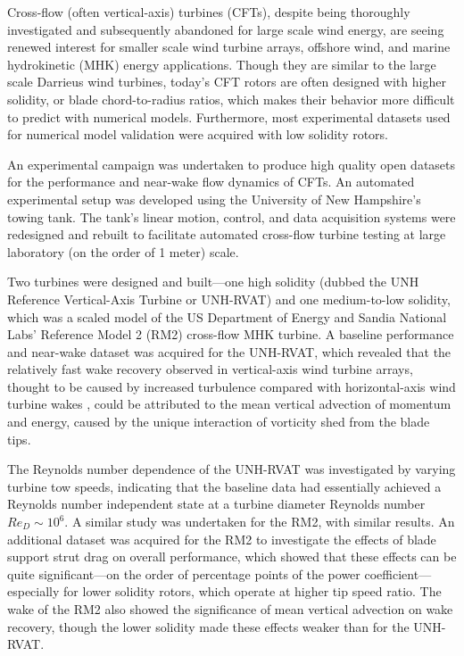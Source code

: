 \begin{Abstractpage}

\setlength{\baselineskip}{1.5\baselineskip}
{

Cross-flow (often vertical-axis) turbines (CFTs), despite being thoroughly
investigated and subsequently abandoned for large scale wind energy, are seeing
renewed interest for smaller scale wind turbine arrays, offshore wind, and
marine hydrokinetic (MHK) energy applications. Though they are similar to the
large scale Darrieus wind turbines, today's CFT rotors are often designed with
higher solidity, or blade chord-to-radius ratios, which makes their behavior
more difficult to predict with numerical models. Furthermore, most experimental
datasets used for numerical model validation were acquired with low solidity
rotors.

An experimental campaign was undertaken to produce high quality open datasets
for the performance and near-wake flow dynamics of CFTs. An automated
experimental setup was developed using the University of New Hampshire's towing
tank. The tank's linear motion, control, and data acquisition systems were
redesigned and rebuilt to facilitate automated cross-flow turbine testing at
large laboratory (on the order of 1 meter) scale.

Two turbines were designed and built---one high solidity (dubbed the UNH
Reference Vertical-Axis Turbine or UNH-RVAT) and one medium-to-low solidity,
which was a scaled model of the US Department of Energy and Sandia National
Labs' Reference Model 2 (RM2) cross-flow MHK turbine. A baseline performance and
near-wake dataset was acquired for the UNH-RVAT, which revealed that the
relatively fast wake recovery observed in vertical-axis wind turbine arrays,
thought to be caused by increased turbulence compared with horizontal-axis wind
turbine wakes \cite{Kinzel2012}, could be attributed to the mean vertical
advection of momentum and energy, caused by the unique interaction of vorticity
shed from the blade tips.

The Reynolds number dependence of the UNH-RVAT was investigated by varying
turbine tow speeds, indicating that the baseline data had essentially achieved a
Reynolds number independent state at a turbine diameter Reynolds number $Re_D
\sim 10^6$. A similar study was undertaken for the RM2, with similar results. An
additional dataset was acquired for the RM2 to investigate the effects of blade
support strut drag on overall performance, which showed that these effects can
be quite significant---on the order of percentage points of the power
coefficient---especially for lower solidity rotors, which operate at higher tip
speed ratio. The wake of the RM2 also showed the significance of mean vertical
advection on wake recovery, though the lower solidity made these effects weaker
than for the UNH-RVAT.

}
\end{Abstractpage}
